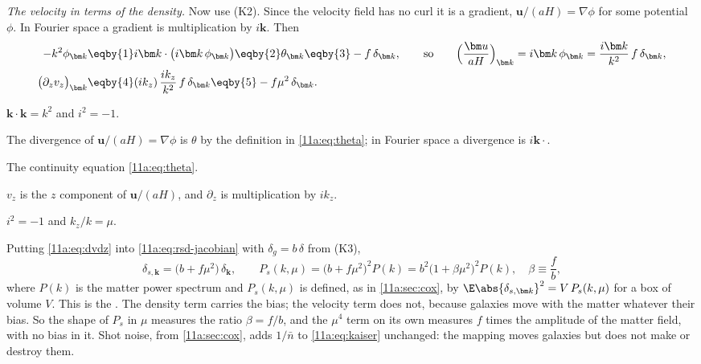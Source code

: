 \emph{The velocity in terms of the density.} Now use (K2). Since the velocity
field has no curl it is a gradient, $\bm u/(aH)=\nabla\phi$ for some potential
$\phi$. In Fourier space a gradient is multiplication by $i\bm k$. Then
\begin{align}
  -k^2\phi_{\bm k}
  &\eqby{1}i\bm k\cdot\bigl(i\bm k\,\phi_{\bm k}\bigr)
   \eqby{2}\theta_{\bm k}
   \eqby{3}-f\,\delta_{\bm k},
  \qquad\text{so}\qquad
  \Bigl(\frac{\bm u}{aH}\Bigr)_{\bm k}=i\bm k\,\phi_{\bm k}
   =\frac{i\bm k}{k^2}\,f\,\delta_{\bm k},
  \nonumber\\
  \bigl(\partial_zv_z\bigr)_{\bm k}
  &\eqby{4}(ik_z)\,\frac{ik_z}{k^2}\,f\,\delta_{\bm k}
   \eqby{5}-f\mu^2\,\delta_{\bm k}.
  \label{11a:eq:dvdz}
\end{align}
\begin{explain}
  \item $\bm k\cdot\bm k=k^2$ and $i^2=-1$.
  \item The divergence of $\bm u/(aH)=\nabla\phi$ is $\theta$ by the definition in
        \eqref{11a:eq:theta}; in Fourier space a divergence is $i\bm k\cdot$.
  \item The continuity equation \eqref{11a:eq:theta}.
  \item $v_z$ is the $z$ component of $\bm u/(aH)$, and $\partial_z$ is
        multiplication by $ik_z$.
  \item $i^2=-1$ and $k_z/k=\mu$.
\end{explain}
Putting \eqref{11a:eq:dvdz} into \eqref{11a:eq:rsd-jacobian} with $\delta_g=b\,\delta$
from (K3),
\begin{equation}
  \delta_{s,\bm k}=\bigl(b+f\mu^2\bigr)\,\delta_{\bm k},
  \qquad
  P_s(k,\mu)=\bigl(b+f\mu^2\bigr)^2P(k)=b^2\bigl(1+\beta\mu^2\bigr)^2P(k),
  \quad\beta\equiv\frac fb ,
  \label{11a:eq:kaiser}
\end{equation}
where $P(k)$ is the matter power spectrum and $P_s(k,\mu)$ is defined, as in
\cref{11a:sec:cox}, by $\E\abs{\delta_{s,\bm k}}^2=V\,P_s(k,\mu)$ for a box of
volume $V$. This is the  \cite{Kaiser1987}. The density
term carries the bias; the velocity term does not, because galaxies move with
the matter whatever their bias. So the shape of $P_s$ in $\mu$ measures the ratio
$\beta=f/b$, and the $\mu^4$ term on its own measures $f$ times the amplitude of
the matter field, with no bias in it. Shot noise, from \cref{11a:sec:cox}, adds $1/\bar n$
to \eqref{11a:eq:kaiser} unchanged: the mapping moves galaxies but does not make
or destroy them.


